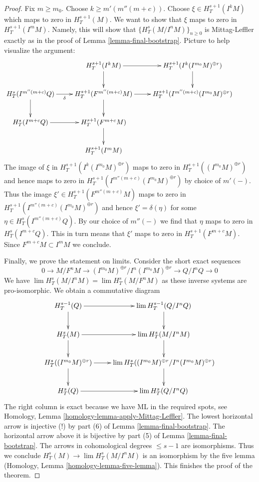 \documentclass{stacks-project}
\theoremstyle{plain}
\theoremstyle{definition}
\theoremstyle{remark}
\numberwithin{equation}{subsection}
\def\lim{\mathop{\mathrm{lim}}\nolimits}
\begin{document}
\begin{proof}
\medskip\noindent
Fix $m \geq m_0$. Choose $k \geq m'(m''(m + c))$.
Choose $\xi \in H^{s + 1}_T(I^kM)$
which maps to zero in $H^{s + 1}_T(M)$.
We want to show that $\xi$ maps to zero in $H^{s + 1}_T(I^mM)$.
Namely, this will show that $\{H^s_T(M/I^nM)\}_{n \geq 0}$
is Mittag-Leffler exactly as in the proof of Lemma \ref{lemma-final-bootstrap}.
Picture to help visualize the argument:
$$
\xymatrix{
&
H^{s + 1}_T(I^kM) \ar[r] \ar[d] &
H^{s + 1}_T(I^k(I^{m_0}M)^{\oplus r}) \ar[d] &
\\
H^s_T(I^{m''(m + c)}Q) \ar[r]_-\delta \ar[d] &
H^{s + 1}_T(F^{m''(m + c)}M) \ar[r] \ar[d] &
H^{s + 1}_T(I^{m''(m + c)}(I^{m_0}M)^{\oplus r}) \\
H^s_T(I^{m + c}Q) \ar[r] &
H^{s + 1}_T(F^{m + c}M) \ar[d] &
\\
&
H^{s + 1}_T(I^mM)
}
$$
The image of $\xi$ in $H^{s + 1}_T(I^k(I^{m_0}M)^{\oplus r})$
maps to zero in $H^{s + 1}_T((I^{m_0}M)^{\oplus r})$
and hence maps to zero in
$H^{s + 1}_T(I^{m''(m + c)}(I^{m_0}M)^{\oplus r})$
by choice of $m'(-)$.
Thus the image $\xi' \in H^{s + 1}_T(F^{m''(m + c)}M)$
maps to zero in $H^{s + 1}_T(I^{m''(m + c)}(I^{m_0}M)^{\oplus r})$
and hence $\xi' = \delta(\eta)$ for some
$\eta \in H^s_T(I^{m''(m + c)}Q)$.
By our choice of $m''(-)$ we find that $\eta$ maps to
zero in $H^s_T(I^{m + c}Q)$.
This in turn means that $\xi'$ maps to zero in
$H^{s + 1}_T(F^{m + c}M)$.
Since $F^{m + c}M \subset I^mM$ we conclude.

\medskip\noindent
Finally, we prove the statement on limits. Consider the short
exact sequences
$$
0 \to M/F^nM \to (I^{m_0}M)^{\oplus r}/I^n (I^{m_0}M)^{\oplus r}
\to Q/I^nQ \to 0
$$
We have $\lim H^s_T(M/I^nM) = \lim H^s_T(M/F^nM)$
as these inverse systems are pro-isomorphic. We obtain a commutative diagram
$$
\xymatrix{
H^{s - 1}_T(Q) \ar[r] \ar[d] &
\lim H^{s - 1}_T(Q/I^nQ) \ar[d] \\
H^s_T(M) \ar[r] \ar[d] &
\lim H^s_T(M/I^nM) \ar[d] \\
H^s_T((I^{m_0}M)^{\oplus r}) \ar[r] \ar[d] &
\lim H^s_T((I^{m_0}M)^{\oplus r}/I^n(I^{m_0}M)^{\oplus r}) \ar[d] \\
H^s_T(Q) \ar[r] &
\lim H^s_T(Q/I^nQ)
}
$$
The right column is exact because we have ML in the required spots, see
Homology, Lemma \ref{homology-lemma-apply-Mittag-Leffler}.
The lowest horizontal arrow is injective (!) by
part (6) of Lemma \ref{lemma-final-bootstrap}.
The horizontal arrow above it is bijective by
part (5) of Lemma \ref{lemma-final-bootstrap}.
The arrows in cohomological degrees $\leq s - 1$ are isomorphisms.
Thus we conclude $H^s_T(M) \to \lim H^s_T(M/I^nM)$
is an isomorphism by the five lemma
(Homology, Lemma \ref{homology-lemma-five-lemma}).
This finishes the proof of the theorem.
\end{proof}
\end{document}

